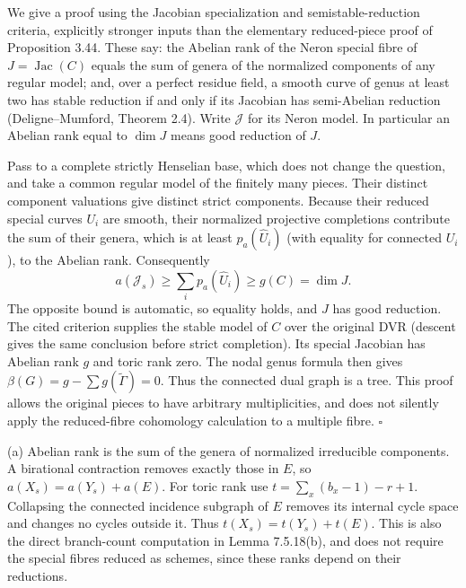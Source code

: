 \documentclass[11pt]{article}
\let\chapterexercise\exercise
\renewcommand{\exercise}[2]{\Needspace{8\baselineskip}\chapterexercise{#1}{#2}}
\begin{document}
\pf We give a proof using the Jacobian specialization and semistable-reduction criteria, explicitly stronger inputs than the elementary reduced-piece proof of Proposition 3.44. These say: the Abelian rank of the Neron special fibre of $J=\operatorname{Jac}(C)$ equals the sum of genera of the normalized components of any regular model; and, over a perfect residue field, a smooth curve of genus at least two has stable reduction if and only if its Jacobian has semi-Abelian reduction (Deligne--Mumford, Theorem 2.4). Write $\mathcal J$ for its Neron model. In particular an Abelian rank equal to $\dim J$ means good reduction of $J$.

Pass to a complete strictly Henselian base, which does not change the question, and take a common regular model of the finitely many pieces. Their distinct component valuations give distinct strict components. Because their reduced special curves $U_i$ are smooth, their normalized projective completions contribute the sum of their genera, which is at least $p_a(\widehat U_i)$ (with equality for connected $U_i$), to the Abelian rank. Consequently
\[ a(\mathcal J_s)\ge\sum_i p_a(\widehat U_i)\ge g(C)=\dim J. \]
The opposite bound is automatic, so equality holds, and $J$ has good reduction. The cited criterion supplies the stable model of $C$ over the original DVR (descent gives the same conclusion before strict completion). Its special Jacobian has Abelian rank $g$ and toric rank zero. The nodal genus formula then gives $\beta(G)=g-\sum g(\widetilde\Gamma)=0$. Thus the connected dual graph is a tree. This proof allows the original pieces to have arbitrary multiplicities, and does not silently apply the reduced-fibre cohomology calculation to a multiple fibre. \hfill$\square$

\pf (a) Abelian rank is the sum of the genera of normalized irreducible components. A birational contraction removes exactly those in $E$, so $a(X_s)=a(Y_s)+a(E)$. For toric rank use $t=\sum_x(b_x-1)-r+1$. Collapsing the connected incidence subgraph of $E$ removes its internal cycle space and changes no cycles outside it. Thus $t(X_s)=t(Y_s)+t(E)$. This is also the direct branch-count computation in Lemma 7.5.18(b), and does not require the special fibres reduced as schemes, since these ranks depend on their reductions.
\end{document}
